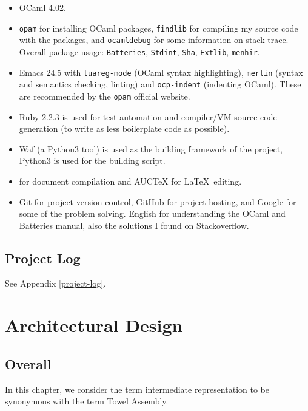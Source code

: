 \documentclass{report}
\begin{document}
\begin{itemize}
\item OCaml 4.02.

\item \texttt{opam} for installing OCaml packages, \texttt{findlib} for compiling my source code with the packages, and \texttt{ocamldebug} for some information on stack trace. Overall package usage: \texttt{Batteries}, \texttt{Stdint}, \texttt{Sha}, \texttt{Extlib}, \texttt{menhir}.

\item Emacs 24.5 with \texttt{tuareg-mode} (OCaml syntax
  highlighting), \texttt{merlin} (syntax and semantics checking,
  linting) and \texttt{ocp-indent} (indenting OCaml). These are
  recommended by the \texttt{opam} official website.

\item Ruby 2.2.3 is used for test automation and compiler/VM source code
  generation (to write as less boilerplate code as possible).

\item Waf (a Python3 tool) is used as the building framework of the
  project, Python3 is used for the building script.

\item \XeTeX{} for document compilation and AUCTeX for \LaTeX ~editing.

\item Git for project version control, GitHub for project hosting, and Google for some of the problem solving. English for understanding the OCaml and Batteries manual, also the solutions I found on Stackoverflow.
\end{itemize}

\section{Project Log}

See Appendix \autoref{project-log}.

\chapter{Architectural Design}

\section{Overall}

In this chapter, we consider the term intermediate representation to be synonymous with the term Towel Assembly.
\end{document}
